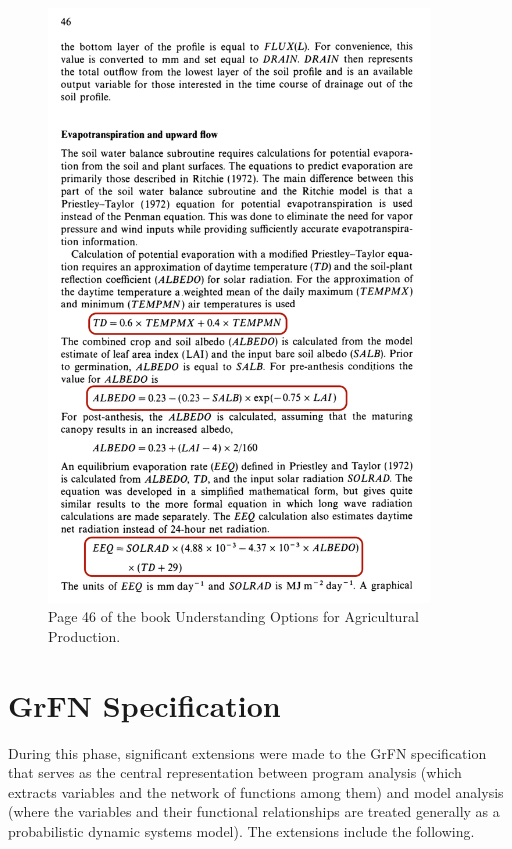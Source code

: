 \documentclass[article, 12pt, oneside]{memoir}
\begin{document}
\begin{figure}
\centering
\includegraphics[width=0.90\textwidth]{figs/petpt_equations_example.png}
\caption{Page 46 of the book Understanding Options for Agricultural
Production.\label{fig:uoap-book}}
\end{figure}


\hypertarget{grfn-specification}{%
\section{GrFN Specification}\label{grfn-specification}}

During this phase, significant extensions were made to the GrFN
specification that serves as the central representation between program
analysis (which extracts variables and the network of functions among
them) and model analysis (where the variables and their functional
relationships are treated generally as a probabilistic dynamic systems
model). The extensions include the following.
\end{document}
